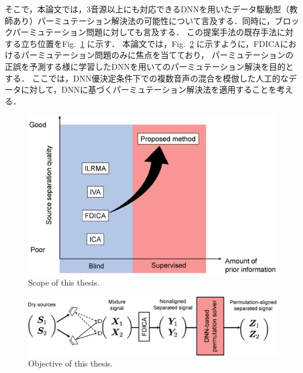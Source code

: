 そこで，本論文では，3音源以上にも対応できるDNNを用いたデータ駆動型（教師あり）パーミュテーション解決法の可能性について言及する．同時に，ブロックパーミュテーション問題に対しても言及する．
この提案手法の既存手法に対する立ち位置をFig.~\ref{fig:scope} に示す．
本論文では，Fig.~\ref{fig:topic} に示すように，FDICAにおけるパーミュテーション問題のみに焦点を当てており，
パーミュテーションの正誤を予測する様に学習したDNNを用いてのパーミュテーション解決を目的とする．
ここでは，DNN優決定条件下での複数音声の混合を模倣した人工的なデータに対して，DNNに基づくパーミュテーション解決法を適用することを考える．

\begin{figure}[t]
    \vspace{4pt}
    \begin{center}
        \includegraphics[width=1.16\columnwidth]{figures/scope.eps}
    \end{center}
    \vspace{-8pt}
	\caption{Scope of this thesis.}
	\label{fig:scope}
\end{figure}

\begin{figure}[h]
    \vspace{4pt}
    \begin{center}
        \includegraphics[width=0.9\columnwidth]{figures/topic.eps}
    \end{center}
    \vspace{-8pt}
	\caption{Objective of this thesis.}
	\label{fig:topic}
\end{figure}


